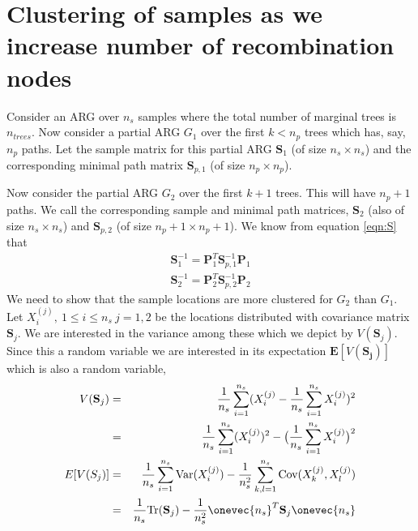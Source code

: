 \section{Clustering of samples as we increase number of recombination nodes}
\label{appendix:clusteringproof}

Consider an ARG over $n_s$ samples where the total number of marginal trees is $n_{trees}$. Now consider a partial ARG $G_1$ over the first $k < n_p$ trees which has, say, $n_p$ paths. Let the sample matrix for this partial ARG $\mathbf{S}_1$ (of size $n_s \times n_s$) and the corresponding minimal path matrix $\mathbf{S}_{p,1}$ (of size $n_p \times n_p$).

Now consider the partial ARG $G_2$ over the first $k+1$ trees. This will have $n_p+1$ paths. We call the corresponding sample and minimal path matrices, $\mathbf{S}_{2}$ (also of size $n_s \times n_s$) and $\mathbf{S}_{p,2}$ (of size $n_p+1 \times n_p +1 $).
We know from equation \ref{eqn:S} that 
\begin{eqnarray}
    \mathbf{S}_1^{-1} = \mathbf{P}_{1}^T\mathbf{S}_{p,1}^{-1}\mathbf{P}_{1} \\ 
    \mathbf{S}_2^{-1} = \mathbf{P}_{2}^T\mathbf{S}_{p,2}^{-1}\mathbf{P}_{2}
\end{eqnarray}
We need to show that the sample locations are more clustered for $G_2$ than $G_1$. Let $X_{i}^{(j)}, \ 1 \leq i\leq n_s \ j=1,2$ be the locations distributed with covariance matrix $\mathbf{S}_j$. We are interested in the variance among these which we depict by $V(\mathbf{S}_j)$. Since this a random variable we are interested in its expectation $\mathbf{E}[V(\mathbf{S_j})]$ which is also a random variable,
\begin{eqnarray}
    V(\mathbf{S}_j) &=& \frac{1}{n_s} \sum_{i=1}^{n_s} (X_i^{(j)} - \frac{1}{n_s}\sum_{i=1}^{n_s} X_i^{(j)})^2 \\
    &=& \frac{1}{n_s} \sum_{i=1}^{n_s} (X_i^{(j)})^2 - \big(\frac{1}{n_s} \sum_{i=1}^{n_s} X_i^{(j)}\big)^2\\
    E[V(S_j)]&=& \frac{1}{n_s} \sum_{i=1}^{n_s} \text{Var}(X_i^{(j)}) - \frac{1}{n_s^2} \sum_{k,l=1}^{n_s} \text{Cov}(X_k^{(j)},X_l^{(j)})\\
    &=& \frac{1}{n_s} \text{Tr}(\mathbf{S}_j)- \frac{1}{n_s^2} \onevec{{n_s}}^T\mathbf{S}_j\onevec{{n_s}}
\end{eqnarray}
